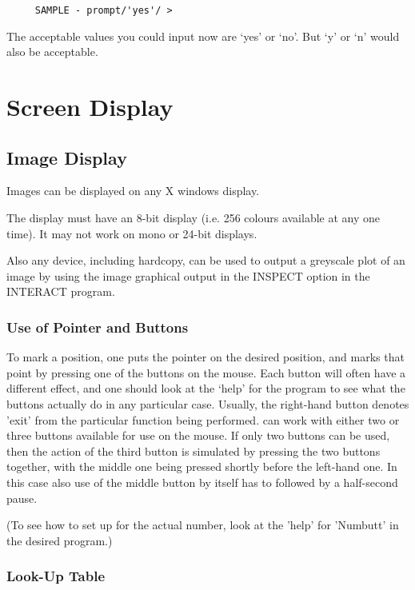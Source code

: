 \begin{verbatim}
     SAMPLE - prompt/'yes'/ > \end{verbatim}

The acceptable values you could input now are `yes' or `no'. But `y' or
`n' would also be acceptable.



\section{Screen Display} 

\subsection{Image Display}

Images can be displayed on any X windows display.

The display must have an 8-bit display (i.e. 256 colours available at
any one time). It may not work on mono or 24-bit displays.

Also any device, including hardcopy, can be used to output a greyscale
plot of an image by using the image graphical output in the INSPECT
option in the INTERACT program.


\subsubsection{Use of Pointer and Buttons}

To mark a position, one puts the pointer on the desired position, and
marks that point by pressing one of the buttons on the mouse. Each
button will often have a different effect, and one should look at the
`help' for the program to see what the buttons actually do in any
particular case.  Usually, the right-hand button denotes 'exit' from
the particular function being performed.  \starman can work with either
two or three buttons available for use on the mouse. If only two
buttons can be used, then the action of the third button is simulated
by pressing the two buttons together, with the middle one being pressed
shortly before the left-hand one. In this case also use of the middle
button by itself has to followed by a half-second pause.

(To see how to set up for the actual number, look at the 'help' for
'Numbutt' in the desired program.)

\subsubsection{Look-Up Table}

